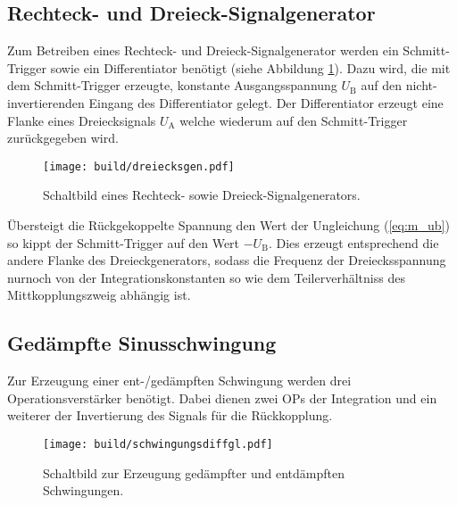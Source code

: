 \subsection{Rechteck- und Dreieck-Signalgenerator}%
\label{sub:signalgenerator}

Zum Betreiben eines Rechteck- und Dreieck-Signalgenerator werden
ein Schmitt-Trigger sowie ein Differentiator benötigt (siehe Abbildung
\ref{fig:sig}).
Dazu wird, die mit dem Schmitt-Trigger erzeugte, konstante Ausgangsspannung $U_\text{B}$
auf den nicht-invertierenden Eingang des Differentiator gelegt.
Der Differentiator erzeugt eine Flanke eines Dreiecksignals $U_\text{A}$
welche wiederum auf den Schmitt-Trigger zurückgegeben wird.
\begin{figure}[ht]
		\centering
		\texttt{[image: build/dreiecksgen.pdf]}
		\caption{Schaltbild eines Rechteck- sowie Dreieck-Signalgenerators. \cite{anleitung}}
		\label{fig:sig}
\end{figure}
Übersteigt die Rückgekoppelte Spannung den Wert der Ungleichung (\ref{eq:m_ub})
so kippt der Schmitt-Trigger auf den Wert $-U_\text{B}$.
Dies erzeugt entsprechend die andere Flanke des Dreieckgenerators, sodass die
Frequenz der Dreiecksspannung nurnoch von der Integrationskonstanten so wie
dem Teilerverhältniss des Mittkopplungszweig abhängig ist.


\subsection{Gedämpfte Sinusschwingung}%
\label{sub:gedaempfte_sinusschwingung}
Zur Erzeugung einer ent-/gedämpften Schwingung werden drei Operationsverstärker
benötigt.
Dabei dienen zwei OPs der Integration und ein weiterer der Invertierung
des Signals für die Rückkopplung.
\begin{figure}[ht]
		\centering
		\texttt{[image: build/schwingungsdiffgl.pdf]}
		\caption{Schaltbild zur Erzeugung gedämpfter und entdämpften Schwingungen. \cite{anleitung}}
		\label{fig:}
\end{figure}

